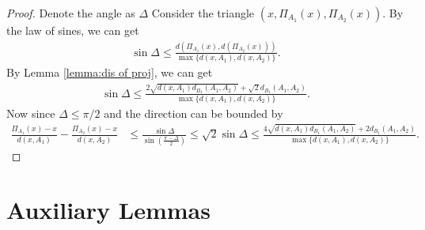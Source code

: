 \begin{proof}
    Denote the angle as $\Delta$ Consider the triangle $(x, \Pi_{A_1}(x), \Pi_{A_2}(x))$. By the law of sines, we can get 
    \begin{align*}
        \sin \Delta \le \frac{d(\Pi_{A_1}(x), d(\Pi_{A_2}(x)))}{\max\{d(x, A_1), d(x, A_2)\}}.
    \end{align*}
    By Lemma \ref{lemma:dis of proj}, we can get 
    \begin{align*}
         \sin \Delta \le \frac{2\sqrt{d(x, A_1)d_{B_1}(A_1,A_2)}+\sqrt{2}d_{B_1}(A_1,A_2)}{\max\{d(x, A_1), d(x, A_2)\}}. 
    \end{align*}
    Now since $\Delta \le \pi/2$ and the direction can be bounded by 
    \begin{align*}
        \frac{\Pi_{A_1}(x)-x}{d(x, A_1)} - \frac{\Pi_{A_2}(x)-x}{d(x, A_2)}&\le \frac{\sin \Delta}{\sin(\frac{\pi-\Delta}{2})}\le \sqrt{2}\sin \Delta\le \frac{4\sqrt{d(x, A_1)d_{B_1}(A_1,A_2)}+2d_{B_1}(A_1,A_2)}{\max\{d(x, A_1), d(x, A_2)\}}.
    \end{align*}
\end{proof}

\section{Auxiliary Lemmas}

